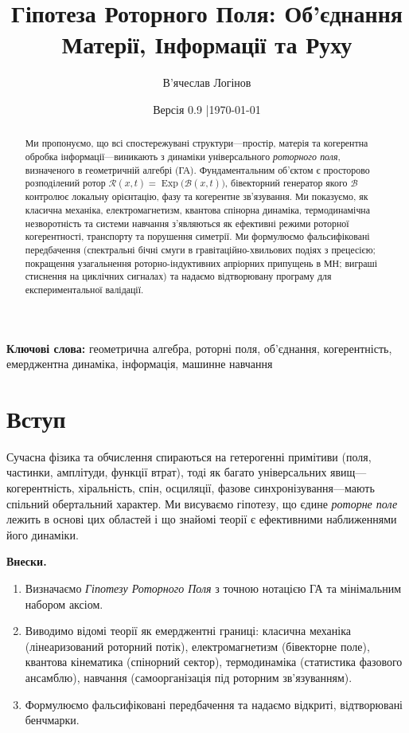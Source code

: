\documentclass[11pt,a4paper]{article}
\title{\textbf{Гіпотеза Роторного Поля: Об'єднання Матерії, Інформації та Руху}}
\author[1]{В'ячеслав Логінов}
\affil[1]{Київ, Україна\\ \texttt{barthez.slavik@gmail.com}}
\date{\small Версія 0.9 \quad|\quad \today}
\newcommand{\Exp}{\operatorname{Exp}}
\newcommand{\Rotor}{\mathcal{R}}
\newcommand{\Biv}{\mathcal{B}}
\theoremstyle{definition}
\theoremstyle{plain}
\theoremstyle{remark}
\begin{document}
\maketitle

\begin{abstract}
\noindent
Ми пропонуємо, що всі спостережувані структури---простір, матерія та когерентна обробка інформації---виникають з динаміки універсального \emph{роторного поля}, визначеного в геометричній алгебрі (ГА). Фундаментальним об'єктом є просторово розподілений ротор $\Rotor(x,t)=\Exp\!\big(\Biv(x,t)\big)$, бівекторний генератор якого $\Biv$ контролює локальну орієнтацію, фазу та когерентне зв'язування. Ми показуємо, як класична механіка, електромагнетизм, квантова спінорна динаміка, термодинамічна незворотність та системи навчання з'являються як ефективні режими роторної когерентності, транспорту та порушення симетрії. Ми формулюємо фальсифіковані передбачення (спектральні бічні смуги в гравітаційно-хвильових подіях з прецесією; покращення узагальнення роторно-індуктивних апріорних припущень в МН; виграші стиснення на циклічних сигналах) та надаємо відтворювану програму для експериментальної валідації.
\end{abstract}

\noindent\textbf{Ключові слова:} геометрична алгебра, роторні поля, об'єднання, когерентність, емерджентна динаміка, інформація, машинне навчання

\vspace{1em}

\section{Вступ}
Сучасна фізика та обчислення спираються на гетерогенні примітиви (поля, частинки, амплітуди, функції втрат), тоді як багато універсальних явищ---когерентність, хіральність, спін, осциляції, фазове синхронізування---мають спільний обертальний характер. Ми висуваємо гіпотезу, що єдине \emph{роторне поле} лежить в основі цих областей і що знайомі теорії є ефективними наближеннями його динаміки.
\medskip

\noindent\textbf{Внески.}
\begin{enumerate}[leftmargin=*,itemsep=2pt]
  \item Визначаємо \emph{Гіпотезу Роторного Поля} з точною нотацією ГА та мінімальним набором аксіом.
  \item Виводимо відомі теорії як емерджентні границі: класична механіка (лінеаризований роторний потік), електромагнетизм (бівекторне поле), квантова кінематика (спінорний сектор), термодинаміка (статистика фазового ансамблю), навчання (самоорганізація під роторним зв'язуванням).
  \item Формулюємо фальсифіковані передбачення та надаємо відкриті, відтворювані бенчмарки.
\end{enumerate}
\end{document}
